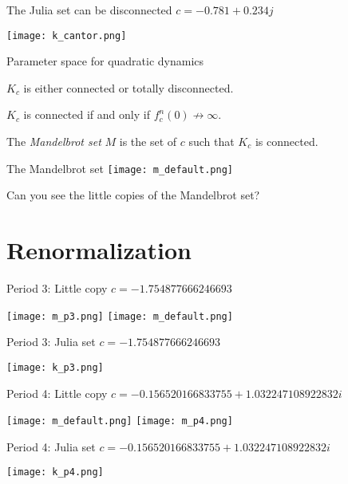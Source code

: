 \documentclass{beamer}
\begin{document}
\begin{frame}{The Julia set can be disconnected}
\centering
$c=-0.781+0.234j$

\texttt{[image: k\_cantor.png]}
\end{frame}

\begin{frame}{Parameter space for quadratic dynamics}
\begin{theorem}
$K_c$ is either connected or totally disconnected.
\end{theorem}
\begin{theorem}
$K_c$ is connected if and only if $f_c^n(0)\not\rightarrow\infty$.
\end{theorem}
\begin{definition}
The \emph{Mandelbrot set} $M$ is the set of $c$ such that $K_c$ is connected.
\end{definition}
\end{frame}

\begin{frame}{The Mandelbrot set}
\centering
\texttt{[image: m\_default.png]}

Can you see the little copies of the Mandelbrot set?
\end{frame}

\section{Renormalization}

\begin{frame}{Period 3: Little copy}
\centering
$c=-1.754877666246693$

\texttt{[image: m\_p3.png]}
\texttt{[image: m\_default.png]}
\end{frame}

\begin{frame}{Period 3: Julia set}
\centering
$c=-1.754877666246693$

\texttt{[image: k\_p3.png]}
\end{frame}

\begin{frame}{Period 4: Little copy}
\centering
$c=-0.156520166833755+1.032247108922832i$

\texttt{[image: m\_default.png]}
\texttt{[image: m\_p4.png]}
\end{frame}

\begin{frame}{Period 4: Julia set}
\centering
$c=-0.156520166833755+1.032247108922832i$

\texttt{[image: k\_p4.png]}
\end{frame}
\end{document}
